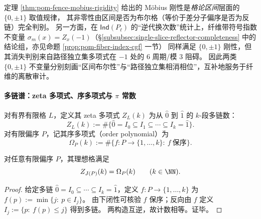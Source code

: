 \begin{remark}\label{rem:pom-fence-mobius-vs-signed-index}
定理 \ref{thm:pom-fence-mobius-rigidity} 给出的 Möbius 刚性是\emph{格论区间}层面的 \(\{0,\pm 1\}\) 取值规律，
其非零性由区间是否为布尔格（等价于差分子偏序是否为反链）完全判别。
另一方面，在 \(\mathsf{Ind}(P_\ell)\) 的“逆代换次数”统计上，纤维带符号指数不变量
\(\sigma_m(x)=Z_x(-1)\)（\S\ref{subsubsec:single-slice-reflector-completeness} 中的结论组，亦见命题 \ref{prop:pom-fiber-index-cgf} 一节）
同样满足 \(\{0,\pm 1\}\) 刚性，但其消失判别来自路径独立集多项式在 \(-1\) 处的 6 周期/模 \(3\) 阻碍。
因此两类 \(\{0,\pm 1\}\) 不变量分别刻画“区间布尔性”与“路径独立集相消相位”，互补地服务于纤维的离散审计。
\end{remark}

\paragraph{多链谱：zeta 多项式、序多项式与 \texorpdfstring{\(\pi\)}{pi} 常数}
\begin{definition}\label{def:pom-zeta-order-polynomial}
对有界有限格 \(L\)，定义其 zeta 多项式 \(Z_L(k)\) 为从 \(\hat0\) 到 \(\hat1\) 的 \(k\)-段多链数：
\[
Z_L(k):=\#\{\hat0=I_0\subseteq I_1\subseteq \cdots \subseteq I_k=\hat1\}.
\]
对有限偏序 \(P\)，记其序多项式（order polynomial）为
\[
\Omega_P(k):=\#\{f:P\to\{1,\dots,k\}:\ f \ \text{保序}\}.
\]
\end{definition}

\begin{theorem}\label{thm:pom-zeta-equals-order-poly}
对任意有限偏序 \(P\)，其理想格满足
\[
Z_{J(P)}(k)=\Omega_P(k)\qquad(k\in\NN).
\]
\end{theorem}
\begin{proof}
给定多链 \(\hat0=I_0\subseteq\cdots\subseteq I_k=\hat1\)，定义 \(f:P\to\{1,\dots,k\}\) 为
\(
f(p):=\min\{j:\ p\in I_j\}
\)。
由下闭性可核验 \(f\) 保序；反向由 \(f\) 定义 \(I_j:=\{p:\ f(p)\le j\}\) 得到多链。
两构造互逆，故计数相等。证毕。
\end{proof}

